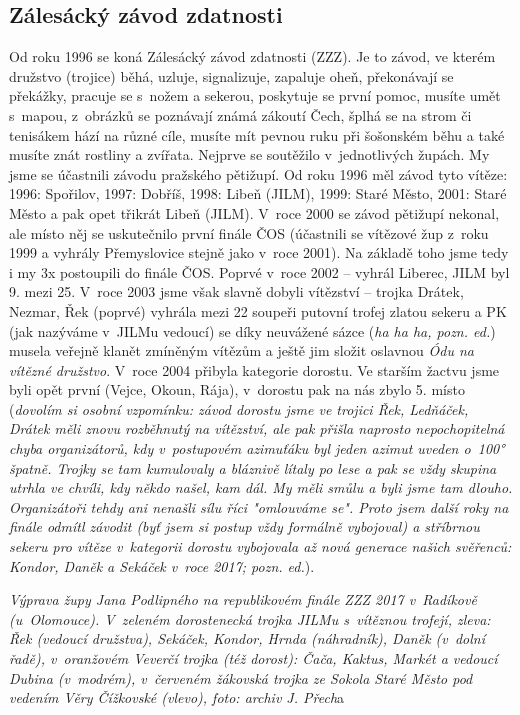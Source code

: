 \documentclass[a5paper, 12pt, twoside]{article}
\begin{document}
\subsection{Zálesácký závod
zdatnosti}

Od roku 1996 se koná Zálesácký závod zdatnosti (ZZZ). Je to závod, ve
kterém družstvo (trojice) běhá, uzluje, signalizuje, zapaluje oheň,
překonávají se překážky, pracuje se s~nožem a sekerou, poskytuje se
první pomoc, musíte umět s~mapou, z~obrázků se poznávají známá zákoutí
Čech, šplhá se na strom či tenisákem hází na různé cíle, musíte mít
pevnou ruku při šošonském běhu a také musíte znát rostliny a zvířata.
Nejprve se soutěžilo v~jednotlivých župách. My jsme se účastnili závodu
pražského pětižupí. Od roku 1996 měl závod tyto vítěze: 1996: Spořilov,
1997: Dobříš, 1998: Libeň (JILM), 1999: Staré Město, 2001: Staré Město a
pak opet třikrát Libeň (JILM). V~roce 2000 se závod pětižupí nekonal,
ale místo něj se uskutečnilo první finále ČOS (účastnili se vítězové žup
z~roku 1999 a vyhrály Přemyslovice stejně jako v~roce 2001). Na základě
toho jsme tedy i my 3x postoupili do finále ČOS. Poprvé v~roce 2002 --
vyhrál Liberec, JILM byl 9. mezi 25. V~roce 2003 jsme však slavně dobyli
vítězství -- trojka Drátek, Nezmar, Řek (poprvé) vyhrála mezi 22 soupeři
putovní trofej zlatou sekeru a PK (jak nazýváme v~JILMu vedoucí) se díky
neuvážené sázce (\textit{ha ha ha, pozn. ed.}) musela veřejně klanět
zmíněným vítězům a ještě jim složit oslavnou \textit{Ódu na vítězné
družstvo}. V~roce 2004 přibyla kategorie dorostu. Ve starším žactvu jsme
byli opět první (Vejce, Okoun, Rája), v~dorostu pak na nás zbylo 5.
místo (\textit{dovolím si osobní vzpomínku: závod dorostu jsme ve trojici
Řek, Ledňáček, Drátek měli znovu rozběhnutý na vítězství, ale pak přišla
naprosto nepochopitelná chyba organizátorů, kdy v~postupovém azimuťáku
byl jeden azimut uveden o~100° špatně. Trojky se tam kumulovaly a
bláznivě lítaly po lese a pak se vždy skupina utrhla ve chvíli, kdy
někdo našel, kam dál. My měli smůlu a byli jsme tam dlouho. Organizátoři
tehdy ani nenašli sílu říci "omlouváme se". Proto jsem další roky na
finále odmítl závodit (byť jsem si postup vždy formálně vybojoval) a
stříbrnou sekeru pro vítěze v~kategorii dorostu vybojovala až nová
generace našich svěřenců: Kondor, Daněk a Sekáček v~roce 2017; pozn.
ed.}).


\textit{Výprava župy Jana Podlipného na republikovém finále ZZZ 2017
v~Radíkově (u~Olomouce). V~zeleném dorostenecká trojka JILMu s~vítěznou
trofejí, zleva: Řek (vedoucí družstva), Sekáček, Kondor, Hrnda
(náhradník), Daněk (v~dolní řadě), v~oranžovém Veverčí trojka (též
dorost): Čača, Kaktus, Markét a vedoucí Dubina (v~modrém), v~červeném
žákovská trojka ze Sokola Staré Město pod vedením Věry Čížkovské
(vlevo), foto: archiv J. Přech}a
\end{document}
